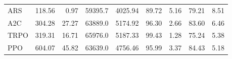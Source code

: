 \begin{samepage}
\begin{center}
\begin{tabular}{l|rr|rr|rr|rr}
    ARS          &   118.56 &     0.97 &    59395.7 &    4025.94 &   89.72 &    5.16 &   79.21 &    8.51 \\
    A2C          &   304.28 &    27.27 &    63889.0 &    5174.92 &   96.30 &    2.66 &   83.60 &    6.46 \\
    TRPO         &   319.31 &    16.71 &    65976.0 &    5187.33 &   99.43 &    1.28 &   75.24 &    5.38 \\
    PPO          &   604.07 &    45.82 &    63639.0 &    4756.46 &   95.99 &    3.37 &   84.43 &    5.18 \\
    \bottomrule
  \end{tabular}
\end{center}
\end{samepage}

